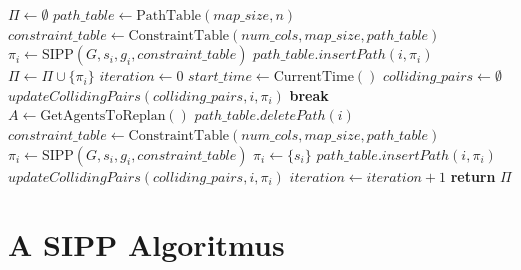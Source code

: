 \documentclass[a4paper,12pt]{article}
\begin{document}
\begin{algorithm}[H]
\caption{LNS2 Algoritmus Részletes Pszeudokódja}
\begin{algorithmic}[1]
    \State $\Pi \gets \emptyset$ 
    \State $path\_table \gets \text{PathTable}(map\_size, n)$ 
     
        \State $constraint\_table \gets \text{ConstraintTable}(num\_cols, map\_size, path\_table)$
        \State $\pi_i \gets \text{SIPP}(G, s_i, g_i, constraint\_table)$ 
        \State $path\_table.insertPath(i, \pi_i)$ 
        \State $\Pi \gets \Pi \cup \{\pi_i\}$
    \EndFor
    \State $iteration \gets 0$
    \State $start\_time \gets \text{CurrentTime}()$
        \State $colliding\_pairs \gets \emptyset$ 
            \State $updateCollidingPairs(colliding\_pairs, i, \pi_i)$ 
        \EndFor
            \State \textbf{break} 
        \EndIf
        \State $A \gets \text{GetAgentsToReplan}()$ 
            \State $path\_table.deletePath(i)$ 
        \EndFor
        \State $constraint\_table \gets \text{ConstraintTable}(num\_cols, map\_size, path\_table)$
            \State $\pi_i \gets \text{SIPP}(G, s_i, g_i, constraint\_table)$ 
             
                \State $\pi_i \gets \{s_i\}$ 
            \EndIf
            \State $path\_table.insertPath(i, \pi_i)$ 
            \State $updateCollidingPairs(colliding\_pairs, i, \pi_i)$ 
        \EndFor
        \State $iteration \gets iteration + 1$
    \EndWhile
    \State \textbf{return} $\Pi$
\EndProcedure
\end{algorithmic}
\end{algorithm}

\section{A SIPP Algoritmus}
\end{document}
